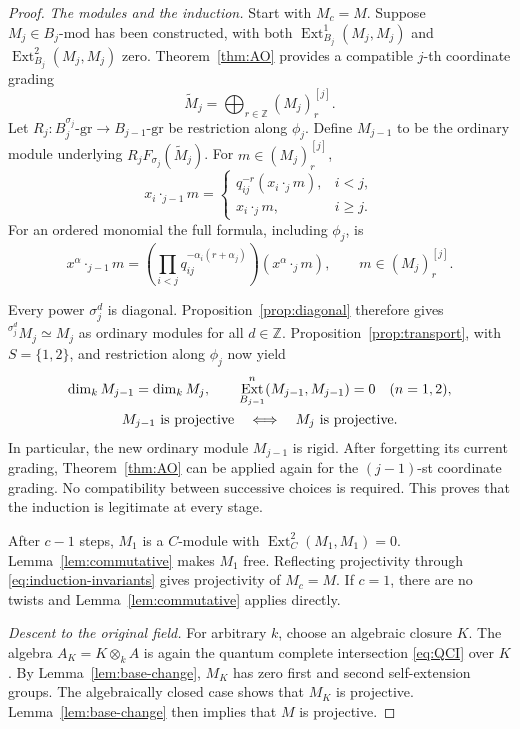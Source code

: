 \documentclass[11pt,a4paper]{article}
\numberwithin{equation}{section}
\theoremstyle{definition}
\theoremstyle{plain}
\theoremstyle{remark}
\DeclareMathOperator{\Ext}{Ext}
\newcommand{\Z}{\mathbb Z}
\newcommand{\gmod}[1]{#1\text{-}\mathrm{gr}}
\newcommand{\umod}[1]{#1\text{-}\mathrm{mod}}
\newcommand{\tw}[2]{{}^{#1}\!#2}
\begin{document}
\begin{proof}
\smallskip\noindent
\emph{The modules and the induction.}
Start with \(M_c=M\). Suppose \(M_j\in\umod{B_j}\) has been constructed,
with both \(\Ext_{B_j}^1(M_j,M_j)\) and \(\Ext_{B_j}^2(M_j,M_j)\) zero.
Theorem~\ref{thm:AO} provides a compatible \(j\)-th coordinate grading
\[
 \widetilde M_j=\bigoplus_{r\in\Z}(M_j)_r^{[j]}.
\]
Let \(R_j:\gmod{B_j^{\sigma_j}}\to\gmod{B_{j-1}}\) be restriction along
\(\phi_j\). Define \(M_{j-1}\) to be the ordinary module underlying
\(R_jF_{\sigma_j}(\widetilde M_j)\). For \(m\in(M_j)_r^{[j]}\),
\begin{equation*}
 x_i\cdot_{j-1}m=
 \begin{cases}
 q_{ij}^{-r}(x_i\cdot_jm),&i<j,\\
 x_i\cdot_jm,&i\geq j.
 \end{cases}
\end{equation*}
For an ordered monomial the full formula, including \(\phi_j\), is
\begin{equation*}
 x^\alpha\cdot_{j-1}m=
 \left(\prod_{i<j}q_{ij}^{-\alpha_i(r+\alpha_j)}\right)
 (x^\alpha\cdot_jm),
 \qquad m\in(M_j)_r^{[j]}.
\end{equation*}

Every power \(\sigma_j^d\) is diagonal. Proposition~\ref{prop:diagonal}
therefore gives \(\tw{\sigma_j^d}{M_j}\simeq M_j\) as ordinary modules
for all \(d\in\Z\). Proposition~\ref{prop:transport}, with
\(S=\{1,2\}\), and restriction along \(\phi_j\) now yield
\begin{gather}\label{eq:induction-invariants}
 \dim_kM_{j-1}=\dim_kM_j,\qquad
 \Ext_{B_{j-1}}^n(M_{j-1},M_{j-1})=0\quad(n=1,2),\\
 M_{j-1}\text{ is projective}
 \quad\Longleftrightarrow\quad M_j\text{ is projective}.\notag
\end{gather}
In particular, the new ordinary module \(M_{j-1}\) is rigid. After
forgetting its current grading, Theorem~\ref{thm:AO} can be applied
again for the \((j-1)\)-st coordinate grading. No compatibility between
successive choices is required. This proves that the induction is
legitimate at every stage.

After \(c-1\) steps, \(M_1\) is a \(C\)-module with
\(\Ext_C^2(M_1,M_1)=0\). Lemma~\ref{lem:commutative} makes \(M_1\)
free. Reflecting projectivity through \eqref{eq:induction-invariants}
gives projectivity of \(M_c=M\). If \(c=1\), there are no twists and
Lemma~\ref{lem:commutative} applies directly.

\smallskip\noindent
\emph{Descent to the original field.}
For arbitrary \(k\), choose an algebraic closure \(K\). The algebra
\(A_K=K\otimes_kA\) is again the quantum complete intersection
\eqref{eq:QCI} over \(K\). By Lemma~\ref{lem:base-change}, \(M_K\)
has zero first and second self-extension groups. The algebraically closed case shows that \(M_K\) is projective.
Lemma~\ref{lem:base-change} then implies that \(M\) is projective.
\end{proof}
\end{document}
